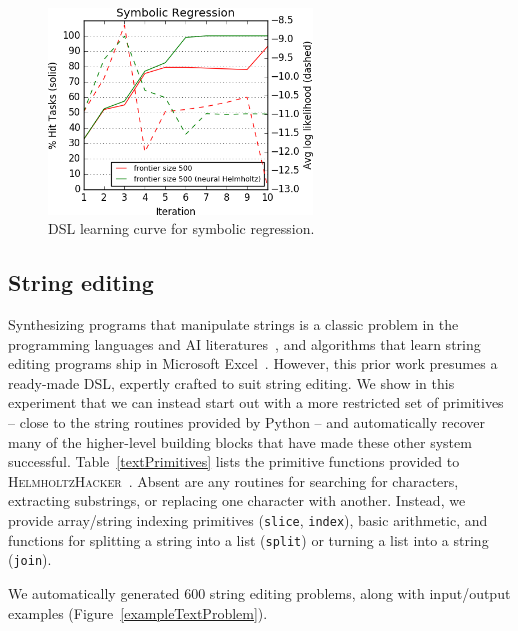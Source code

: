 \documentclass{article}
\newcommand{\system}{\textsc{HelmholtzHacker}~}
\begin{document}
\begin{figure}\centering
  \includegraphics[width = 7cm]{figures/symbolicRegression.png}
  \caption{DSL learning curve for symbolic regression.}\label{regressionLearningCurve}
\end{figure}

\subsection{String editing}\label{textSection}
Synthesizing programs that manipulate strings is a classic problem in the
programming languages and AI literatures~\cite{menon2013machine,lau2001programming},
and algorithms that learn string editing programs ship in Microsoft Excel~\cite{gulwani2011automating}.
However, this prior work presumes a ready-made DSL,
expertly crafted to suit string editing.
We show in this experiment that we can instead start out with a
more restricted set of primitives -- close to the string routines provided by Python --
and automatically recover many of the higher-level building blocks that have made these
other system successful.
Table~\ref{textPrimitives} lists the primitive functions provided to \system.
Absent are any routines for searching for characters, extracting substrings,
or replacing one character with another.
Instead, we provide array/string indexing primitives (\texttt{slice}, \texttt{index}),
basic arithmetic, and functions for splitting a string into a list (\texttt{split})
or turning a list into a string (\texttt{join}).

We automatically generated  600 string editing problems,
along with input/output examples (Figure~\ref{exampleTextProblem}).
\end{document}
